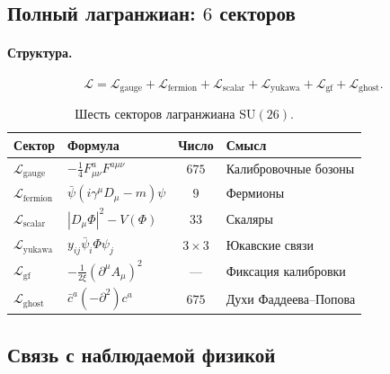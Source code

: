 \documentclass[11pt,a4paper]{article}
\newcommand{\SU}{\mathrm{SU}}
\theoremstyle{definition}
\begin{document}
\subsection{Полный лагранжиан: $6$ секторов}
\label{subsec:lagrangian}

\paragraph{Структура.}
\begin{equation}
    \mathcal{L} = \mathcal{L}_{\text{gauge}} 
    + \mathcal{L}_{\text{fermion}} 
    + \mathcal{L}_{\text{scalar}} 
    + \mathcal{L}_{\text{yukawa}} 
    + \mathcal{L}_{\text{gf}} 
    + \mathcal{L}_{\text{ghost}}.
\end{equation}

\begin{table}[htbp]
\centering
\caption{Шесть секторов лагранжиана $\SU(26)$.}
\label{tab:lagrangian-sectors}
\begin{tabular}{llcl}
\toprule
Сектор & Формула & Число & Смысл \\ 
\midrule
$\mathcal{L}_{\text{gauge}}$ & $-\tfrac14 F_{\mu\nu}^a F^{a\mu\nu}$ 
    & $675$ & Калибровочные бозоны \\[0.3em]
$\mathcal{L}_{\text{fermion}}$ & $\bar\psi(i\gamma^\mu D_\mu - m)\psi$ 
    & $9$ & Фермионы \\[0.3em]
$\mathcal{L}_{\text{scalar}}$ & $|D_\mu \Phi|^2 - V(\Phi)$ 
    & $33$ & Скаляры \\[0.3em]
$\mathcal{L}_{\text{yukawa}}$ & $y_{ij} \bar\psi_i \Phi \psi_j$ 
    & $3 \times 3$ & Юкавские связи \\[0.3em]
$\mathcal{L}_{\text{gf}}$ & $-\tfrac{1}{2\xi}(\partial^\mu A_\mu)^2$ 
    & --- & Фиксация калибровки \\[0.3em]
$\mathcal{L}_{\text{ghost}}$ & $\bar c^a (-\partial^2) c^a$ 
    & $675$ & Духи Фаддеева--Попова \\ 
\bottomrule
\end{tabular}
\end{table}

\subsection{Связь с наблюдаемой физикой}
\label{subsec:observed-physics}
\end{document}
